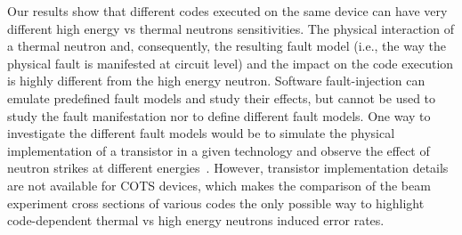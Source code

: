 Our results show that different codes executed on the same device can have very different high energy vs thermal neutrons sensitivities. 
The physical interaction of a thermal neutron and, consequently, the resulting fault model (i.e., the way the physical fault is manifested at circuit level) and the impact on the code execution is highly different from the high energy neutron. 
Software fault-injection can emulate predefined fault models and study their effects, but cannot be used to study the fault manifestation nor to define different fault models. One way to investigate the different fault models would be to simulate the physical implementation of a transistor in a given technology and observe the effect of neutron strikes at different energies~\cite{Dodd2005}. However, transistor implementation details are not available for COTS devices, which makes the comparison of the beam experiment cross sections of various codes the only possible way to highlight code-dependent thermal vs high energy neutrons induced error rates.

